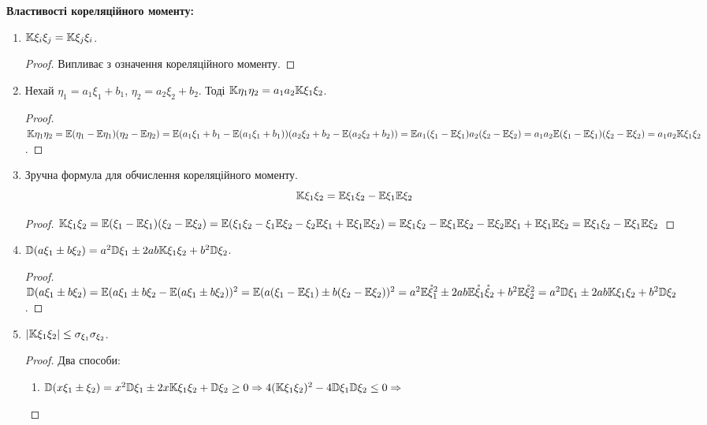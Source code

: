 \noindent \textbf{Властивості кореляційного моменту:}
\begin{enumerate}
    \item $\mathbb{K}\xi_i\xi_j = \mathbb{K}\xi_j\xi_i$.
    \begin{proof}
        Випливає з означення кореляційного моменту.
    \end{proof}
    \item Нехай $\eta_1 = a_1\xi_1 + b_1$, $\eta_2 = a_2\xi_2 + b_2$.
    Тоді $\mathbb{K}\eta_1\eta_2 = a_1a_2\mathbb{K}\xi_1\xi_2$.
    \begin{proof}
        $\mathbb{K}\eta_1\eta_2 = \mathbb{E}(\eta_1 - \mathbb{E}\eta_1)(\eta_2 - \mathbb{E}\eta_2) = 
        \mathbb{E}(a_1\xi_1 + b_1 - \mathbb{E}(a_1\xi_1 + b_1))
        (a_2\xi_2 + b_2 - \mathbb{E}(a_2\xi_2 + b_2)) = 
        \mathbb{E} a_1(\xi_1 - \mathbb{E}\xi_1)a_2(\xi_2 - \mathbb{E}\xi_2) = 
        a_1a_2\mathbb{E}(\xi_1 - \mathbb{E}\xi_1)(\xi_2 - \mathbb{E}\xi_2) = 
        a_1a_2\mathbb{K}\xi_1\xi_2$.
    \end{proof}

    \item Зручна формула для обчислення кореляційного моменту.
    \begin{equation}
        \mathbb{K}\xi_1\xi_2 = \mathbb{E}\xi_1\xi_2 - \mathbb{E}\xi_1 \mathbb{E}\xi_2
    \end{equation}
    \begin{proof}
        $\mathbb{K}\xi_1\xi_2 = \mathbb{E}(\xi_1 - \mathbb{E}\xi_1)(\xi_2 - \mathbb{E}\xi_2) = 
        \mathbb{E}(\xi_1\xi_2 - \xi_1\mathbb{E}\xi_2 - \xi_2\mathbb{E}\xi_1 + \mathbb{E}\xi_1\mathbb{E}\xi_2) = 
        \mathbb{E}\xi_1\xi_2 - \mathbb{E}\xi_1\mathbb{E}\xi_2 - \mathbb{E}\xi_2\mathbb{E}\xi_1 + \mathbb{E}\xi_1\mathbb{E}\xi_2 = 
        \mathbb{E}\xi_1\xi_2 - \mathbb{E}\xi_1\mathbb{E}\xi_2$
    \end{proof}
    
    \item $\mathbb{D}(a\xi_1 \pm b\xi_2) = a^2\mathbb{D}\xi_1 \pm 2ab\mathbb{K}\xi_1\xi_2 + 
    b^2\mathbb{D}\xi_2$.

    \begin{proof}
        $\mathbb{D}(a\xi_1 \pm b\xi_2) = 
        \mathbb{E}(a\xi_1 \pm b\xi_2 - \mathbb{E}(a\xi_1 \pm b\xi_2))^2 =
        \mathbb{E}(a(\xi_1-\mathbb{E}\xi_1)\pm b(\xi_2 - \mathbb{E}\xi_2))^2 = 
        a^2 \mathbb{E}\mathring{\xi}_1^2 \pm 2ab\mathbb{E}\mathring{\xi}_1\mathring{\xi} _2 
        + b^2 \mathbb{E}\mathring{\xi}_2^2 = 
        a^2\mathbb{D}\xi_1 \pm 2ab\mathbb{K}\xi_1\xi_2 + b^2\mathbb{D}\xi_2$.
    \end{proof}

    \item\label{cov_ineq} $\left|\mathbb{K}\xi_1\xi_2\right| \leq \sigma_{\xi_1} \sigma_{\xi_2}$.
    \begin{proof}
        Два способи: 
        \begin{enumerate}[label=\Roman*.]
            \item $\mathbb{D}(x\xi_1 \pm \xi_2) = x^2 \mathbb{D}\xi_1 \pm 2x\mathbb{K}\xi_1\xi_2 + \mathbb{D}\xi_2 \geq 0 
            \Rightarrow 4(\mathbb{K}\xi_1\xi_2)^2 - 4\mathbb{D}\xi_1\mathbb{D}\xi_2 \leq 0 
            \Rightarrow $


\end{enumerate}
\end{proof}
\end{enumerate}
